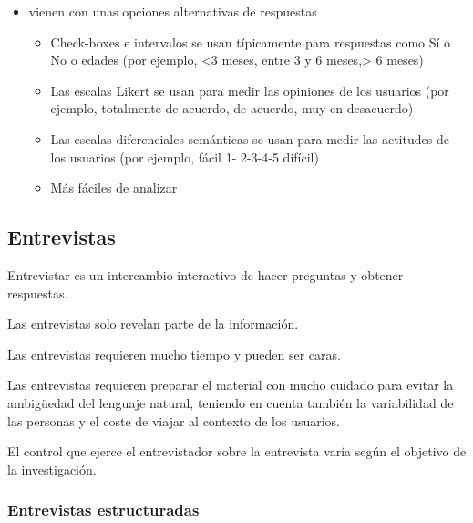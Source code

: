 \documentclass[12pt, twoside, openright]{report} %
\begin{document}
\begin{itemize}
	\item vienen con unas opciones alternativas de respuestas

	      \begin{itemize}
		      \item Check-boxes e intervalos se usan típicamente para respuestas
		            como Sí o No o edades (por ejemplo, \textless3 meses, entre
		            3 y 6 meses,\textgreater{} 6 meses)

		      \item Las escalas Likert se usan para medir las opiniones de los
		            usuarios (por ejemplo, totalmente de acuerdo, de acuerdo,
		            muy en desacuerdo)

		      \item Las escalas diferenciales semánticas se usan para medir las
		            actitudes de los usuarios (por ejemplo, fácil 1- 2-3-4-5
		            difícil)

		      \item Más fáciles de analizar
	      \end{itemize}
\end{itemize}

\subsection{Entrevistas}


Entrevistar es un intercambio interactivo de hacer preguntas y
obtener respuestas.

Las entrevistas solo revelan parte de la información.

Las entrevistas requieren mucho tiempo y pueden ser caras.

Las entrevistas requieren preparar el material con mucho cuidado
para evitar la ambigüedad del lenguaje natural, teniendo en
cuenta también la variabilidad de las personas y el coste de
viajar al contexto de los usuarios.

El control que ejerce el entrevistador sobre la entrevista varía
según el objetivo de la investigación.

\subsubsection{Entrevistas estructuradas}
\end{document}
